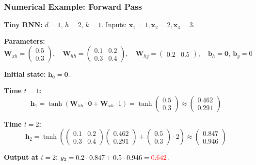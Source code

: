 \documentclass[notes,11pt, aspectratio=169]{beamer}
\newcommand{\vx}{\mathbf{x}}
\newcommand{\vb}{\mathbf{b}}
\newcommand{\vh}{\mathbf{h}}
\newcommand{\vW}{\mathbf{W}}
\begin{document}
\begin{frame}
\frametitle{Numerical Example: Forward Pass}

\textbf{Tiny RNN:} $d = 1$, $h = 2$, $k = 1$. Inputs: $\vx_1 = 1, \vx_2 = 2, \vx_3 = 3$.

\vspace{4pt}
\textbf{Parameters:}
\[
    \vW_{xh} = \begin{pmatrix} 0.5 \\ 0.3 \end{pmatrix},\quad
    \vW_{hh} = \begin{pmatrix} 0.1 & 0.2 \\ 0.3 & 0.4 \end{pmatrix},\quad
    \vW_{hy} = \begin{pmatrix} 0.2 & 0.5 \end{pmatrix},\quad
    \vb_h = \mathbf{0},\ \vb_y = 0
\]

\textbf{Initial state:} $\vh_0 = \mathbf{0}$.

\vspace{4pt}
\textbf{Time $t = 1$:}
\[
    \vh_1 = \tanh(\vW_{hh} \cdot \mathbf{0} + \vW_{xh} \cdot 1) = \tanh\!\begin{pmatrix}0.5\\0.3\end{pmatrix} \approx \begin{pmatrix}0.462\\0.291\end{pmatrix}
\]

\textbf{Time $t = 2$:}
\[
    \vh_2 = \tanh\!\left(\begin{pmatrix}0.1 & 0.2\\0.3 & 0.4\end{pmatrix}\!\begin{pmatrix}0.462\\0.291\end{pmatrix} + \begin{pmatrix}0.5\\0.3\end{pmatrix}\!\cdot 2\right) \approx \begin{pmatrix}0.847\\0.946\end{pmatrix}
\]

\textbf{Output at $t = 2$:} $y_2 = 0.2 \cdot 0.847 + 0.5 \cdot 0.946 = \textcolor{red}{0.642}$.
\end{frame}
\end{document}
